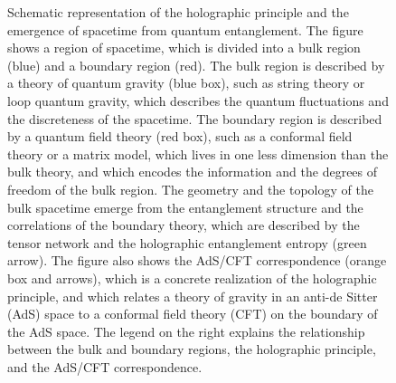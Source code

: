 \begin{figure}[h]
    \caption{Schematic representation of the holographic principle and the emergence of spacetime from quantum entanglement. The figure shows a region of spacetime, which is divided into a bulk region (blue) and a boundary region (red). The bulk region is described by a theory of quantum gravity (blue box), such as string theory or loop quantum gravity, which describes the quantum fluctuations and the discreteness of the spacetime. The boundary region is described by a quantum field theory (red box), such as a conformal field theory or a matrix model, which lives in one less dimension than the bulk theory, and which encodes the information and the degrees of freedom of the bulk region. The geometry and the topology of the bulk spacetime emerge from the entanglement structure and the correlations of the boundary theory, which are described by the tensor network and the holographic entanglement entropy (green arrow). The figure also shows the AdS/CFT correspondence (orange box and arrows), which is a concrete realization of the holographic principle, and which relates a theory of gravity in an anti-de Sitter (AdS) space to a conformal field theory (CFT) on the boundary of the AdS space. The legend on the right explains the relationship between the bulk and boundary regions, the holographic principle, and the AdS/CFT correspondence.}
    \label{fig:holographic_principle}
\end{figure}

